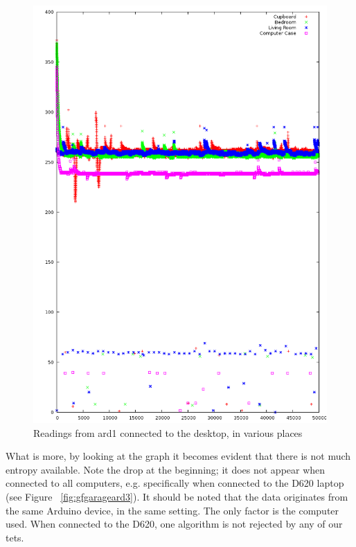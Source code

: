 \documentclass[a4paper]{article}           %
\begin{document}
\begin{figure}[h!]
  \centering  
  \includegraphics[width=0.7\columnwidth]{img/RoomTempOverlay.png}
  
  \caption{Readings from ard1 connected to the desktop, in various places}
  \label{fig:ard3space}
\end{figure}

What is more, by looking at the graph it becomes evident that there is not much entropy available. Note the drop at the beginning; it does not appear when connected to all computers, e.g. specifically when connected to the D620 laptop (see Figure ~\ref{fig:gfgarageard3}). It should be noted that the data originates from the same Arduino device, in the same setting. The only factor is the computer used. When connected to the D620, one algorithm is not rejected by any of our tets. 
\end{document}
